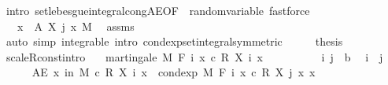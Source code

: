 \begin{isabellebody}
\ {\isacharparenleft}{\kern0pt}intro\ set{\isacharunderscore}{\kern0pt}lebesgue{\isacharunderscore}{\kern0pt}integral{\isacharunderscore}{\kern0pt}cong{\isacharunderscore}{\kern0pt}AE{\isacharbrackleft}{\kern0pt}OF\ {\isacharunderscore}{\kern0pt}\ random{\isacharunderscore}{\kern0pt}variable{\isacharbrackright}{\kern0pt}{\isacharparenright}{\kern0pt}\ fastforce{\isacharplus}{\kern0pt}\isanewline
\ \ \isamarkupfalse%
\ \isamarkupfalse%
\ {\isachardoublequoteopen}{\isachardot}{\kern0pt}{\isachardot}{\kern0pt}{\isachardot}{\kern0pt}\ {\isacharequal}{\kern0pt}\ {\isasymintegral}x\ {\isasymin}\ A{\isachardot}{\kern0pt}\ X\ j\ x\ {\isasympartial}M{\isachardoublequoteclose}\ \isamarkupfalse%
\ assms{\isacharparenleft}{\kern0pt}{}{\isacharparenright}{\kern0pt}\ \isamarkupfalse%
\ {\isacharparenleft}{\kern0pt}auto\ simp{\isacharcolon}{\kern0pt}\ integrable\ intro{\isacharcolon}{\kern0pt}\ cond{\isacharunderscore}{\kern0pt}exp{\isacharunderscore}{\kern0pt}set{\isacharunderscore}{\kern0pt}integral{\isacharbrackleft}{\kern0pt}symmetric{\isacharbrackright}{\kern0pt}{\isacharparenright}{\kern0pt}\isanewline
\ \ \isamarkupfalse%
\ \isamarkupfalse%
\ {\isacharquery}{\kern0pt}thesis\ \isacommand{{\isachardot}{\kern0pt}}\isamarkupfalse%
\isanewline
{}\isamarkupfalse%
%
\endisatagproof
{\isafoldproof}%
%
\isadelimproof
\isanewline
%
\endisadelimproof
\isanewline
{}\isamarkupfalse%
\ scaleR{\isacharunderscore}{\kern0pt}const{\isacharbrackleft}{\kern0pt}intro{\isacharbrackright}{\kern0pt}{\isacharcolon}{\kern0pt}\isanewline
\ \ \ {\isachardoublequoteopen}martingale\ M\ F\ {\isacharparenleft}{\kern0pt}{\isasymlambda}i\ x{\isachardot}{\kern0pt}\ c\ {\isacharasterisk}{\kern0pt}\isactrlsub R\ X\ i\ x{\isacharparenright}{\kern0pt}{\isachardoublequoteclose}\isanewline
%
\isadelimproof
%
\endisadelimproof
%
\isatagproof
{}\isamarkupfalse%
\ {\isacharminus}{\kern0pt}\isanewline
\ \ \isacommand{{\isacharbraceleft}{\kern0pt}}\isamarkupfalse%
\isanewline
\ \ \ \ \isamarkupfalse%
\ i\ j\ {\isacharcolon}{\kern0pt}{\isacharcolon}{\kern0pt}\ {\isacharprime}{\kern0pt}b\ \isamarkupfalse%
\ {\isachardoublequoteopen}i\ {\isasymle}\ j{\isachardoublequoteclose}\isanewline
\ \ \ \ \isamarkupfalse%
\ {\isachardoublequoteopen}AE\ x\ in\ M{\isachardot}{\kern0pt}\ c\ {\isacharasterisk}{\kern0pt}\isactrlsub R\ X\ i\ x\ {\isacharequal}{\kern0pt}\ cond{\isacharunderscore}{\kern0pt}exp\ M\ {\isacharparenleft}{\kern0pt}F\ i{\isacharparenright}{\kern0pt}\ {\isacharparenleft}{\kern0pt}{\isasymlambda}x{\isachardot}{\kern0pt}\ c\ {\isacharasterisk}{\kern0pt}\isactrlsub R\ X\ j\ x{\isacharparenright}{\kern0pt}\ x{\isachardoublequoteclose}\ \isanewline

\end{isabellebody}
